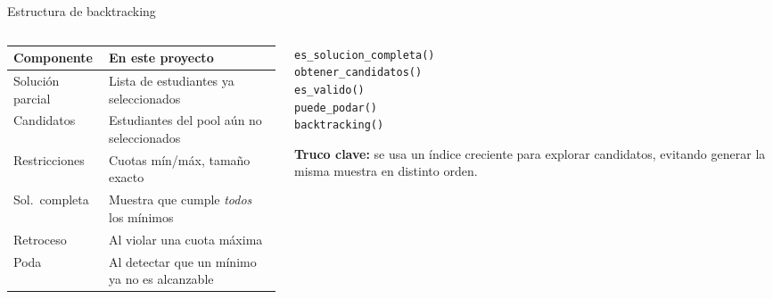 \documentclass[aspectratio=169, 10pt]{beamer}
\begin{document}
\begin{frame}{Estructura de backtracking}
  \begin{columns}[T]
    \begin{column}{0.5\textwidth}
      \begin{tabular}{lp{5cm}}
        \toprule
        \textbf{Componente} & \textbf{En este proyecto} \\
        \midrule
        Solución parcial & Lista de estudiantes ya seleccionados \\[4pt]
        Candidatos & Estudiantes del pool aún no seleccionados \\[4pt]
        Restricciones & Cuotas mín/máx, tamaño exacto \\[4pt]
        Sol.\ completa & Muestra que cumple \emph{todos} los mínimos \\[4pt]
        Retroceso & Al violar una cuota máxima \\[4pt]
        Poda & Al detectar que un mínimo ya no es alcanzable \\
        \bottomrule
      \end{tabular}
    \end{column}
    \begin{column}{0.47\textwidth}
      \begin{tcolorbox}[colback=accentazul!8, colframe=accentazul, title=Las 5 funciones base]
        \tiny
        \texttt{es\_solucion\_completa()} \\
        \texttt{obtener\_candidatos()} \\
        \texttt{es\_valido()} \\
        \texttt{puede\_podar()} \\
        \texttt{backtracking()} \\
      \end{tcolorbox}

      \vspace{0.3cm}
      \textbf{Truco clave:} se usa un índice creciente para explorar candidatos, evitando generar la misma muestra en distinto orden.
    \end{column}
  \end{columns}
\end{frame}
\end{document}
